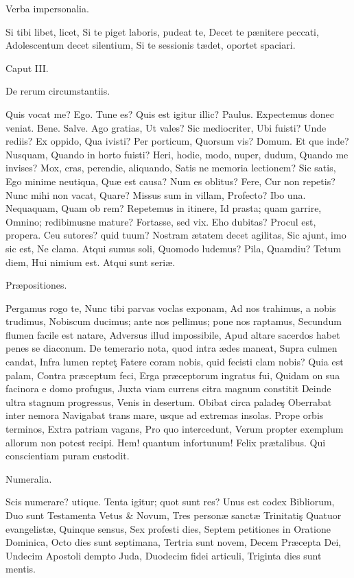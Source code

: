 \documentclass{book}
\begin{document}
Verba impersonalia.

Si tibi libet, licet,
Si te piget laboris, pudeat te,
Decet te pænitere peccati,
Adolescentum decet silentium,
Si te sessionis tædet, oportet spaciari.

Caput III.

De rerum circumstantiis.

Quis vocat me? Ego.
Tune es? Quis est igitur illic? Paulus.
Expectemus donec veniat. Bene.
Salve. Ago gratias,
Ut vales? Sic mediocriter,
Ubi fuisti? Unde rediis? Ex oppido,
Qua ivisti? Per porticum,
Quorsum vis? Domum.
Et que inde? Nusquam,
Quando in horto fuisti?
Heri, hodie, modo, nuper, dudum,
Quando me invises?
Mox, cras, perendie, aliquando,
Satis ne memoria lectionem? Sic satis,
Ego minime neutiqua,
Quæ est causa? Num es oblitus? Fere,
Cur non repetis?
Nunc mihi non vacat,
Quare? Missus sum in villam,
Profecto? Ibo una. Nequaquam,
Quam ob rem? Repetemus in itinere,
Id prasta; quam garrire,
Omnino; redibimusne mature?
Fortasse, sed vix. Eho dubitas?
Procul est, propera.
Ceu sutores? quid tuum?
Nostram ætatem decet agilitas,
Sic ajunt, imo sic est,
Ne clama. Atqui sumus soli,
Quomodo ludemus? Pila,
Quamdiu? Tetum diem,
Hui nimium est. Atqui sunt seriæ.

Præpositiones.

Pergamus rogo te,
Nunc tibi parvas voclas exponam,
Ad nos trahimus, a nobis trudimus,
Nobiscum ducimus; ante nos pellimus; pone nos raptamus,
Secundum flumen facile est natare,
Adversus illud impossibile,
Apud altare sacerdos habet penes se diaconum.
De temerario nota, quod intra ædes maneat,
Supra culmen candat,
Infra lumen repteţ
Fatere coram nobis, quid fecisti clam nobis?
Quia est palam,
Contra præceptum feci,
Erga præceptorum ingratus fui,
Quidam on sua facinora e domo profugus,
Juxta viam currens citra magnum constitit
Deinde ultra stagnum progressus,
Venis in desertum.
Obibat circa paladeş
Oberrabat inter nemora
Navigabat trans mare, usque ad extremas insolas.
Prope orbis terminos,
Extra patriam vagans,
Pro quo intercedunt,
Verum propter exemplum allorum non potest recipi.
Hem! quantum infortunum!
Felix prætalibus.
Qui conscientiam puram custodit.

Numeralia.

Scis numerare? utique.
Tenta igitur; quot sunt res?
Unus est codex Bibliorum,
Duo sunt Testamenta Vetus & Novum,
Tres personæ sanctæ Trinitatiş
Quatuor evangelistæ,
Quinque sensus,
Sex profesti dies,
Septem petitiones in Oratione Dominica,
Octo dies sunt septimana,
Tertria sunt novem,
Decem Præcepta Dei,
Undecim Apostoli dempto Juda,
Duodecim fidei articuli,
Triginta dies sunt mentis.
\end{document}

